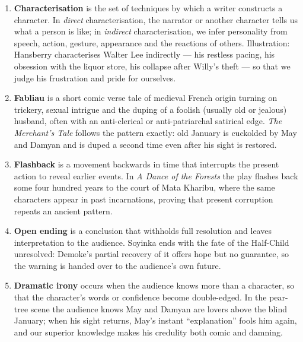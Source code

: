 \documentclass[11pt]{article}
\begin{document}
\begin{corrige}
\begin{enumerate}
\item \textbf{Characterisation} is the set of techniques by which a writer constructs a character. In \emph{direct} characterisation, the narrator or another character tells us what a person is like; in \emph{indirect} characterisation, we infer personality from speech, action, gesture, appearance and the reactions of others. Illustration: Hansberry characterises Walter Lee indirectly --- his restless pacing, his obsession with the liquor store, his collapse after Willy's theft --- so that we judge his frustration and pride for ourselves.
\item \textbf{Fabliau} is a short comic verse tale of medieval French origin turning on trickery, sexual intrigue and the duping of a foolish (usually old or jealous) husband, often with an anti-clerical or anti-patriarchal satirical edge. \emph{The Merchant's Tale} follows the pattern exactly: old January is cuckolded by May and Damyan and is duped a second time even after his sight is restored.
\item \textbf{Flashback} is a movement backwards in time that interrupts the present action to reveal earlier events. In \emph{A Dance of the Forests} the play flashes back some four hundred years to the court of Mata Kharibu, where the same characters appear in past incarnations, proving that present corruption repeats an ancient pattern.
\item \textbf{Open ending} is a conclusion that withholds full resolution and leaves interpretation to the audience. Soyinka ends with the fate of the Half-Child unresolved: Demoke's partial recovery of it offers hope but no guarantee, so the warning is handed over to the audience's own future.
\item \textbf{Dramatic irony} occurs when the audience knows more than a character, so that the character's words or confidence become double-edged. In the pear-tree scene the audience knows May and Damyan are lovers above the blind January; when his sight returns, May's instant ``explanation'' fools him again, and our superior knowledge makes his credulity both comic and damning.
\end{enumerate}
\end{corrige}
\end{document}
